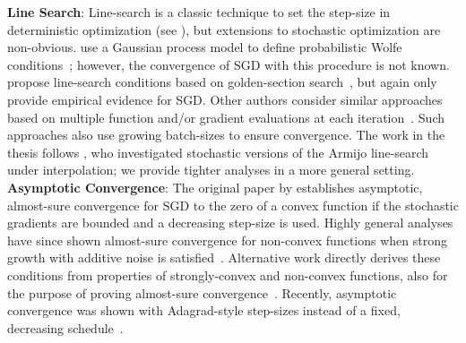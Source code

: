 \noindent \textbf{Line Search}:
Line-search is a classic technique to set the step-size in deterministic optimization (see \citet{nocedal1999numerical}), but extensions to stochastic optimization are non-obvious. 
\citet{mahsereci2017pls} use a Gaussian process model to define probabilistic Wolfe conditions~\citep{wolfe1969convergence, wolfe1971convergence}; however, the convergence of \ac{SGD} with this procedure is not known.
\citet{fridovich2019choosing} propose line-search conditions based on golden-section search~\citep{avriel1968golden}, but again only provide empirical evidence for \ac{SGD}. 
Other authors consider similar approaches based on multiple function and/or gradient evaluations at each iteration~\citep{friedlander2012hybrid, byrd2012sample, de2016big}.
Such approaches also use growing batch-sizes to ensure convergence.
The work in the thesis follows \citet{vaswani2019painless}, who investigated stochastic versions of the Armijo line-search under interpolation; we provide tighter analyses in a more general setting.\\ 


\noindent \textbf{Asymptotic Convergence}:
The original paper by \citet{robbins1951sgd} establishes asymptotic, almost-sure convergence for \ac{SGD} to the zero of a convex function if the stochastic gradients are bounded and a decreasing step-size is used.
Highly general analyses have since shown almost-sure convergence for non-convex functions when strong growth with additive noise is satisfied~\citep{bertsekas2000gradient, bottou1991approche}.
Alternative work directly derives these conditions from properties of strongly-convex and non-convex functions, also for the purpose of proving almost-sure convergence~\citep{nguyen2018sgd, lei2019stochastic}.
Recently, asymptotic convergence was shown with Adagrad-style step-sizes instead of a fixed, decreasing schedule~\citep{li2019convergence}.


\endinput
